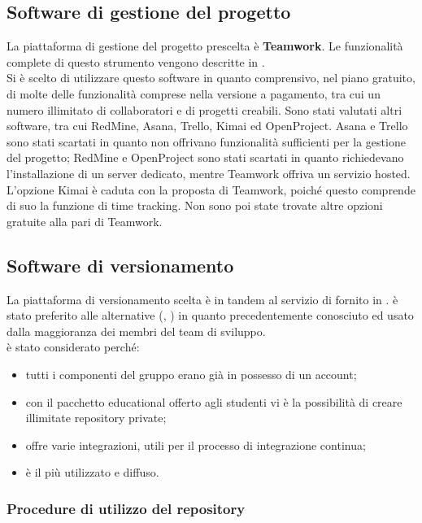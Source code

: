 \subsection{Software di gestione del progetto}
La piattaforma di gestione del progetto prescelta è \textbf{Teamwork}. Le funzionalità complete di questo strumento vengono descritte in .\\
Si è scelto di utilizzare questo software in quanto comprensivo, nel piano gratuito, di molte delle funzionalità comprese nella versione a pagamento, tra cui un numero illimitato di collaboratori e di progetti creabili. Sono stati valutati altri software, tra cui RedMine, Asana, Trello, Kimai ed OpenProject. Asana e Trello sono stati scartati in quanto non offrivano funzionalità sufficienti per la gestione del progetto; RedMine e OpenProject sono stati scartati in quanto richiedevano l'installazione di un server dedicato, mentre Teamwork offriva un servizio hosted. L'opzione Kimai è caduta con la proposta di Teamwork, poiché questo comprende di suo la funzione di time tracking. Non sono poi state trovate altre opzioni gratuite alla pari di Teamwork.

\subsection{Software di versionamento}
La piattaforma di versionamento scelta è  in tandem al servizio di  fornito in .  è stato preferito alle alternative (, ) in quanto precedentemente conosciuto ed usato dalla maggioranza dei membri del team di sviluppo.\\
 è stato considerato perché:
\begin{itemize}
	\item tutti i componenti del gruppo erano già in possesso di un account;
	\item con il pacchetto educational offerto agli studenti vi è la possibilità di creare illimitate repository private;
	\item offre varie integrazioni, utili per il processo di integrazione continua;
	\item è il più utilizzato e diffuso.
\end{itemize}

\subsubsection{Procedure di utilizzo del repository}

